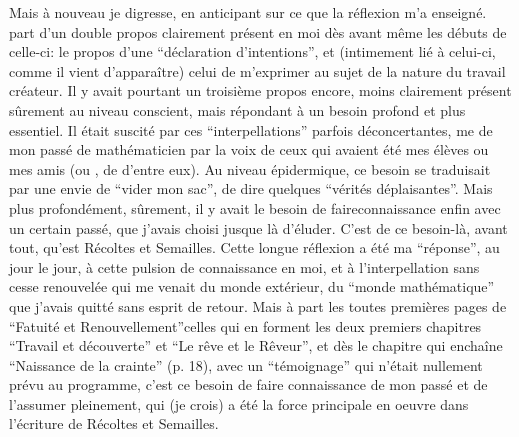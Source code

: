  Mais à nouveau je digresse, en anticipant sur ce que la réflexion m'a enseigné.  part d'un double propos\inserted{,} clairement présent en moi dès avant même les débuts de celle-ci: le propos d'une ``déclaration d'intentions'', et (intimement lié à celui-ci, comme il vient d'apparaître) celui de m'exprimer au sujet de la nature du travail créateur. Il y avait pourtant un troisième propos encore, moins clairement présent sûrement au niveau conscient, mais répondant à un besoin  profond et plus essentiel. Il était suscité par ces ``interpellations'' parfois déconcertantes, me  de mon passé de mathématicien par la voix de ceux qui avaient été mes élèves ou mes amis\unsure{(} (ou , de  d'entre eux). Au niveau épidermique, ce besoin se traduisait par une envie de ``vider mon sac'', de dire quelques ``vérités déplaisantes''. Mais plus profondément, sûrement, il y avait le besoin de  f\enspace a\enspace i\enspace r\enspace e\quad c\enspace o\enspace n\enspace n\enspace a\enspace i\enspace s\enspace s\enspace a\enspace n\enspace c\enspace e enfin avec un certain passé, que j'avais choisi jusque là d'éluder. C'est de ce besoin-là, avant tout, qu'est  Récoltes et Semailles. Cette longue réflexion a été ma ``réponse'', au jour le jour, à cette pulsion de connaissance en moi, et à l'interpellation sans cesse renouvelée qui me venait du monde extérieur, du ``monde mathématique'' que j'avais quitté sans esprit de retour. Mais à part les toutes premières pages de ``Fatuité et Renouvellement''\deleted{,}\inserted{(}celles qui en forment les deux premiers chapitres ``Travail et découverte'' et ``Le rêve et le Rêveur''\inserted{)}, et dès le chapitre qui enchaîne ``Naissance de la crainte'' (p. 18), avec un ``témoignage'' qui n'était nullement prévu au programme, c'est ce besoin de faire connaissance de mon passé et de l'assumer pleinement, qui (je crois) a été la force principale en oeuvre dans l'écriture de Récoltes et Semailles.

